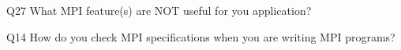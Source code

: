 \begin{description}%
\item{Q27} What MPI feature(s) are NOT useful for you application?%
\item{Q14} How do you check MPI specifications when you are writing MPI programs?%
\end{description}%
